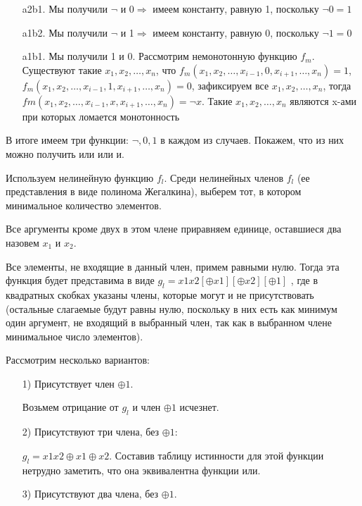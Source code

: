 \begin{enumerate}
\begin{enumerate}
\begin{enumerate}
        \item[a2b1.] Мы получили $\neg$ и 0$\Rightarrow$ имеем константу, равную 1, поскольку $\neg 0=1$

        \item[a1b2.] Мы получили $\neg$ и 1$\Rightarrow$ имеем константу, равную 0, поскольку $\neg 1=0$

        \item[a1b1.] Мы получили 1 и 0. Рассмотрим немонотонную функцию $f_m$. Существуют такие $x_1,x_2,\ldots,x_n$, что $f_m(x_1,x_2,\ldots,x_{i-1},0,x_{i+1},\ldots,x_n)=1$, 
        $f_m(x_1,x_2,…,x_{i-1},1,x_{i+1},\ldots,x_n)=0$, зафиксируем все $x_1,x_2,…,x_n$, тогда $fm(x_1,x_2,…,x_{i-1},x,x_{i+1},\ldots,x_n)=\neg x$.  Такие   $x_1,x_2,\ldots,x_n$ являются x-ами при которых ломается монотонность

    \end{enumerate}
    В итоге  имеем три функции: $\neg, 0, 1$ в каждом из случаев. Покажем, что из них можно получить или или и.

    Используем нелинейную функцию $f_l$. Среди нелинейных членов $f_l$
 (ее представления в виде полинома Жегалкина), выберем тот, в котором минимальное количество элементов. 
 
 Все аргументы кроме двух в этом члене приравняем единице, оставшиеся два назовем $x_1$
 и $x_2$. 
 
 Все элементы, не входящие в данный член, примем равными нулю. Тогда эта функция будет представима в виде $g_l=x1x2[\oplus x1][\oplus x2][\oplus 1]$ 
, где в квадратных скобках указаны члены, которые могут и не присутствовать (остальные слагаемые будут равны нулю, поскольку в них есть как минимум один аргумент, не входящий в выбранный член, так как в выбранном члене минимальное число элементов).

Рассмотрим несколько вариантов:

\begin{enumerate}
    \item[1)] Присутствует член  $\oplus 1$.
    
    Возьмем отрицание от $g_l$ и член $\oplus 1$ исчезнет.
    \item[2)] Присутствуют три члена, без $\oplus 1:$
    
    $ g_l=x1x2\oplus x1 \oplus  x2$. Составив таблицу истинности для этой функции нетрудно заметить, что она эквивалентна функции или.
    \item[3)] Присутствуют два члена, без  $\oplus 1$.
    

\end{enumerate}
\end{enumerate}
\end{enumerate}
